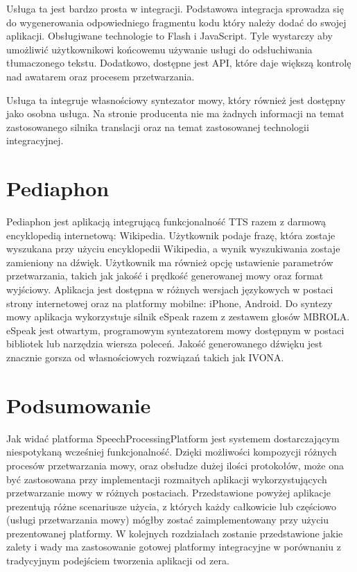 Usługa ta jest bardzo prosta w integracji. Podstawowa integracja sprowadza się do wygenerowania odpowiedniego fragmentu kodu który należy dodać do swojej aplikacji. Obsługiwane technologie to Flash i JavaScript. Tyle wystarczy aby umożliwić użytkownikowi końcowemu używanie usługi do odsłuchiwania tłumaczonego tekstu. Dodatkowo, dostępne jest API, które daje większą kontrolę nad awatarem oraz procesem przetwarzania. 

Usługa ta integruje własnościowy syntezator mowy, który również jest dostępny jako osobna usługa. Na stronie producenta nie ma żadnych informacji na temat zastosowanego silnika translacji oraz na temat zastosowanej technologii integracyjnej.

\section {Pediaphon} 

Pediaphon\cite{pediaphon} jest aplikacją integrującą funkcjonalność TTS razem z darmową encyklopedią internetową: Wikipedia. Użytkownik podaje frazę, która zostaje wyszukana przy użyciu encyklopedii Wikipedia, a wynik wyszukiwania zostaje zamieniony na dźwięk. Użytkownik ma również opcję ustawienie parametrów przetwarzania, takich jak jakość i prędkość generowanej mowy oraz format wyjściowy. Aplikacja jest dostępna w różnych wersjach językowych w postaci strony internetowej oraz na platformy mobilne: iPhone, Android. Do syntezy mowy aplikacja wykorzystuje silnik eSpeak razem z zestawem głosów MBROLA. eSpeak jest otwartym, programowym syntezatorem mowy dostępnym w postaci bibliotek lub narzędzia wiersza poleceń. Jakość generowanego dźwięku jest znacznie gorsza od własnościowych rozwiązań takich jak IVONA.

\section*{Podsumowanie} 
Jak widać platforma SpeechProcessingPlatform jest systemem dostarczającym niespotykaną wcześniej funkcjonalność. Dzięki możliwości kompozycji różnych procesów przetwarzania mowy, oraz obsłudze dużej ilości protokołów, może ona być zastosowana przy implementacji rozmaitych aplikacji wykorzystujących przetwarzanie mowy w różnych postaciach. Przedstawione powyżej aplikacje prezentują różne scenariusze użycia, z których każdy całkowicie lub częściowo (usługi przetwarzania mowy) mógłby zostać zaimplementowany przy użyciu prezentowanej platformy. W kolejnych rozdziałach zostanie przedstawione jakie zalety i wady ma zastosowanie gotowej platformy integracyjne w porównaniu z tradycyjnym podejściem tworzenia aplikacji od zera.





